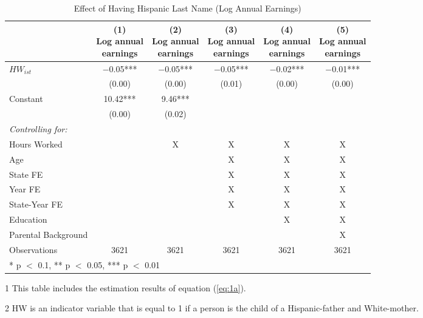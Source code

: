\begin{table}[H]
\centering\centering
\caption{Effect of Having Hispanic Last Name (Log Annual Earnings) \label{tab:lastnamereg}}
\centering
\begin{threeparttable}
\begin{tabular}[t]{lccccc}
\toprule
  & \specialcell{(1) \\ Log annual \\ earnings} & \specialcell{(2) \\ Log annual \\ earnings} & \specialcell{(3) \\ Log annual \\ earnings} & \specialcell{(4) \\  Log annual \\ earnings} & \specialcell{(5) \\  Log annual \\ earnings}\\
\midrule
$HW_{ist}$ & \num{-0.05}*** & \num{-0.05}*** & \num{-0.05}*** & \num{-0.02}*** & \num{-0.01}***\\
 & (\num{0.00}) & (\num{0.00}) & (\num{0.01}) & (\num{0.00}) & (\num{0.00})\\
Constant & \num{10.42}*** & \num{9.46}*** &  &  & \\
 & (\num{0.00}) & (\num{0.02}) &  &  & \\
\midrule
\textit{Controlling for:} &  &  &  &  & \\
Hours Worked &  & X & X & X & X\\
Age &  &  & X & X & X\\
State FE &  &  & X & X & X\\
Year FE &  &  & X & X & X\\
State-Year FE &  &  & X & X & X\\
Education &  &  &  & X & X\\
Parental Background &  &  &  &  & X\\
Observations & \num{3621} & \num{3621} & \num{3621} & \num{3621} & \num{3621}\\
\bottomrule
\multicolumn{6}{l}{\rule{0pt}{1em}* p $<$ 0.1, ** p $<$ 0.05, *** p $<$ 0.01}\\
\end{tabular}
\begin{tablenotes}
\item[1] {\footnotesize{This table includes the estimation results of equation (\ref{eq:1a}).}}
\item[2] {\footnotesize{HW is an indicator variable that is equal to 1 if a person is the child of a Hispanic-father and White-mother.}}

\end{tablenotes}
\end{threeparttable}
\end{table}
